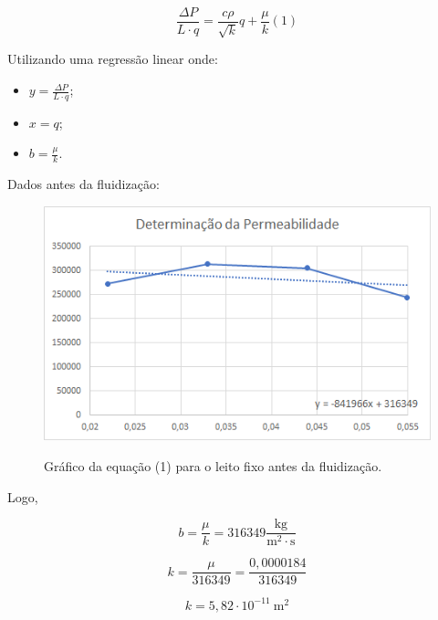 \begin{equation}\label{key}
\frac{\Delta P}{L \cdot q}=\frac{c \rho}{\sqrt{k}} q+\frac{\mu}{k}(1)
\end{equation}

Utilizando uma regressão linear onde:

\begin{itemize}
	\item $y=\frac{\Delta P}{L \cdot q}$;
	\item $x=q$;
	\item $b=\frac{\mu}{k}$.
\end{itemize}


Dados antes da fluidização:

\begin{figure}[H]
	\begin{center}
		\includegraphics[scale=.8, trim={0 0 0 0}]{figuras/ladeq/fluid/graph4}
		\label{fig7}
		\caption{Gráfico da equação (1) para o leito fixo antes da fluidização.}
	\end{center}
\end{figure}

Logo,

\begin{equation}\label{key}
b=\frac{\mu}{k}=316349 \frac{\mathrm{kg}}{\mathrm{m}^{2} \cdot \mathrm{s}}
\end{equation}

\begin{equation}\label{key}
k=\frac{\mu}{316349}=\frac{0,0000184}{316349}
\end{equation}

\begin{equation}\label{key}
k=5,82 \cdot 10^{-11} \ \mathrm{m}^{2}
\end{equation}

